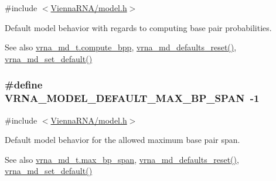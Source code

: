 {\ttfamily \#include $<$\hyperlink{model_8h}{Vienna\+R\+N\+A/model.\+h}$>$}



Default model behavior with regards to computing base pair probabilities. 

\begin{DoxySeeAlso}{See also}
\hyperlink{group__model__details_aa0c3e03d9064363e27adcc92b8d0380f}{vrna\+\_\+md\+\_\+t.\+compute\+\_\+bpp}, \hyperlink{group__model__details_ga70834424cf804d149937de89f80ceb45}{vrna\+\_\+md\+\_\+defaults\+\_\+reset()}, \hyperlink{group__model__details_ga8ac6ff84936282436f822644bf841f66}{vrna\+\_\+md\+\_\+set\+\_\+default()} 
\end{DoxySeeAlso}
\subsubsection[{\texorpdfstring{V\+R\+N\+A\+\_\+\+M\+O\+D\+E\+L\+\_\+\+D\+E\+F\+A\+U\+L\+T\+\_\+\+M\+A\+X\+\_\+\+B\+P\+\_\+\+S\+P\+AN}{VRNA_MODEL_DEFAULT_MAX_BP_SPAN}}]{\setlength{\rightskip}{0pt plus 5cm}\#define V\+R\+N\+A\+\_\+\+M\+O\+D\+E\+L\+\_\+\+D\+E\+F\+A\+U\+L\+T\+\_\+\+M\+A\+X\+\_\+\+B\+P\+\_\+\+S\+P\+AN~-\/1}\hypertarget{group__model__details_ga7cb6f4ae8fdebff6746a4410814f2977}{}\label{group__model__details_ga7cb6f4ae8fdebff6746a4410814f2977}


{\ttfamily \#include $<$\hyperlink{model_8h}{Vienna\+R\+N\+A/model.\+h}$>$}



Default model behavior for the allowed maximum base pair span. 

\begin{DoxySeeAlso}{See also}
\hyperlink{group__model__details_a659e5fcc6e8c9f1a68e7de6548eef3b0}{vrna\+\_\+md\+\_\+t.\+max\+\_\+bp\+\_\+span}, \hyperlink{group__model__details_ga70834424cf804d149937de89f80ceb45}{vrna\+\_\+md\+\_\+defaults\+\_\+reset()}, \hyperlink{group__model__details_ga8ac6ff84936282436f822644bf841f66}{vrna\+\_\+md\+\_\+set\+\_\+default()} 
\end{DoxySeeAlso}
